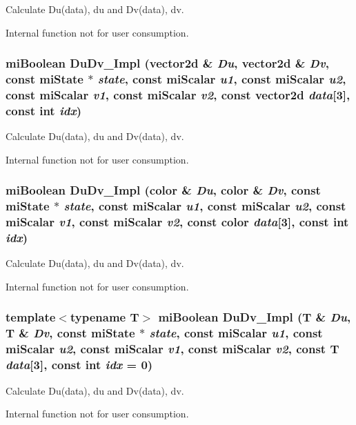 Calculate Du(data), du and Dv(data), dv.

Internal function not for user consumption. 
\subsubsection{\setlength{\rightskip}{0pt plus 5cm}mi\-Boolean Du\-Dv\_\-Impl (vector2d \& {\em Du}, vector2d \& {\em Dv}, const mi\-State $\ast$ {\em state}, const mi\-Scalar {\em u1}, const mi\-Scalar {\em u2}, const mi\-Scalar {\em v1}, const mi\-Scalar {\em v2}, const vector2d {\em data}[3], const int {\em idx})\hspace{0.3cm}{\tt  [inline]}}\label{namespacemr_a38}


Calculate Du(data), du and Dv(data), dv.

Internal function not for user consumption. 
\subsubsection{\setlength{\rightskip}{0pt plus 5cm}mi\-Boolean Du\-Dv\_\-Impl (color \& {\em Du}, color \& {\em Dv}, const mi\-State $\ast$ {\em state}, const mi\-Scalar {\em u1}, const mi\-Scalar {\em u2}, const mi\-Scalar {\em v1}, const mi\-Scalar {\em v2}, const color {\em data}[3], const int {\em idx})\hspace{0.3cm}{\tt  [inline]}}\label{namespacemr_a37}


Calculate Du(data), du and Dv(data), dv.

Internal function not for user consumption. 
\subsubsection{\setlength{\rightskip}{0pt plus 5cm}template$<$typename T$>$ mi\-Boolean Du\-Dv\_\-Impl (T \& {\em Du}, T \& {\em Dv}, const mi\-State $\ast$ {\em state}, const mi\-Scalar {\em u1}, const mi\-Scalar {\em u2}, const mi\-Scalar {\em v1}, const mi\-Scalar {\em v2}, const T {\em data}[3], const int {\em idx} = 0)\hspace{0.3cm}{\tt  [inline]}}\label{namespacemr_a36}


Calculate Du(data), du and Dv(data), dv.

Internal function not for user consumption. 
